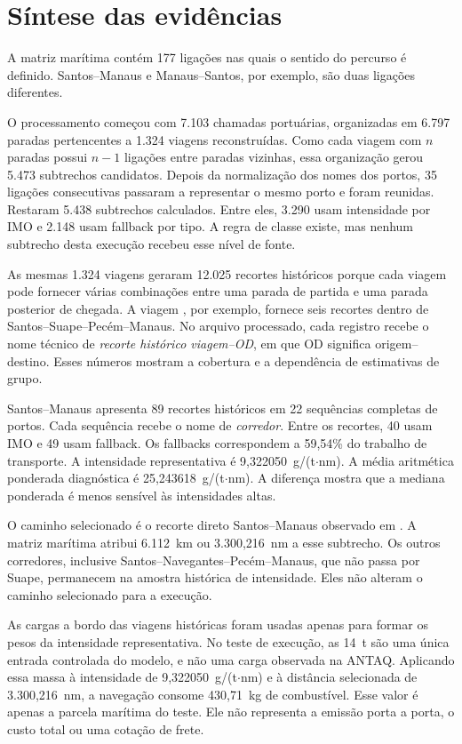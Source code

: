 \section{Síntese das evidências}
\label{sec:alcance-evidencias-conclusao}

A matriz marítima contém 177 ligações nas quais o sentido do percurso é definido. Santos--Manaus e Manaus--Santos, por exemplo, são duas ligações diferentes.

O processamento começou com 7.103 chamadas portuárias, organizadas em 6.797 paradas pertencentes a 1.324 viagens reconstruídas. Como cada viagem com $n$ paradas possui $n-1$ ligações entre paradas vizinhas, essa organização gerou 5.473 subtrechos candidatos. Depois da normalização dos nomes dos portos, 35 ligações consecutivas passaram a representar o mesmo porto e foram reunidas. Restaram 5.438 subtrechos calculados. Entre eles, 3.290 usam intensidade por IMO e 2.148 usam fallback por tipo. A regra de classe existe, mas nenhum subtrecho desta execução recebeu esse nível de fonte.

As mesmas 1.324 viagens geraram 12.025 recortes históricos porque cada viagem pode fornecer várias combinações entre uma parada de partida e uma parada posterior de chegada. A viagem , por exemplo, fornece seis recortes dentro de Santos--Suape--Pecém--Manaus. No arquivo processado, cada registro recebe o nome técnico de \emph{recorte histórico viagem--OD}, em que OD significa origem--destino. Esses números mostram a cobertura e a dependência de estimativas de grupo.

Santos--Manaus apresenta 89 recortes históricos em 22 sequências completas de portos. Cada sequência recebe o nome de \emph{corredor}. Entre os recortes, 40 usam IMO e 49 usam fallback. Os fallbacks correspondem a 59,54\% do trabalho de transporte. A intensidade representativa é 9,322050~g/(t$\cdot$nm). A média aritmética ponderada diagnóstica é 25,243618~g/(t$\cdot$nm). A diferença mostra que a mediana ponderada é menos sensível às intensidades altas.

O caminho selecionado é o recorte direto Santos--Manaus observado em . A matriz marítima atribui 6.112~km ou 3.300,216~nm a esse subtrecho. Os outros corredores, inclusive Santos--Navegantes--Pecém--Manaus, que não passa por Suape, permanecem na amostra histórica de intensidade. Eles não alteram o caminho selecionado para a execução.

As cargas a bordo das viagens históricas foram usadas apenas para formar os pesos da intensidade representativa. No teste de execução, as 14~t são uma única entrada controlada do modelo, e não uma carga observada na ANTAQ. Aplicando essa massa à intensidade de 9,322050~g/(t$\cdot$nm) e à distância selecionada de 3.300,216~nm, a navegação consome 430,71~kg de combustível. Esse valor é apenas a parcela marítima do teste. Ele não representa a emissão porta a porta, o custo total ou uma cotação de frete.

